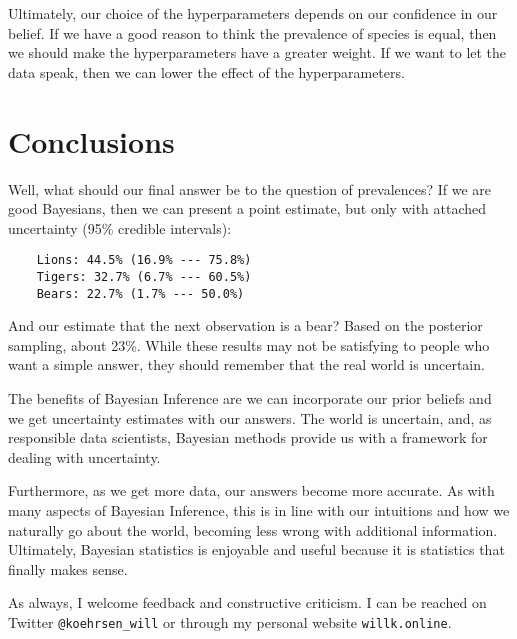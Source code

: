 Ultimately, our choice of the hyperparameters depends on our confidence in our belief. If we have a good reason to think the prevalence of species is equal, then we should make the hyperparameters have a greater weight. If we want to let the data speak, then we can lower the effect of the hyperparameters.

\FloatBarrier
\section{Conclusions}

Well, what should our final answer be to the question of prevalences? If we are good Bayesians, then we can present a point estimate, but only with attached uncertainty (95\% credible intervals):

\begin{lstlisting}
    Lions: 44.5% (16.9% --- 75.8%)
    Tigers: 32.7% (6.7% --- 60.5%)
    Bears: 22.7% (1.7% --- 50.0%)
\end{lstlisting}
And our estimate that the next observation is a bear? Based on the posterior sampling, about 23\%. While these results may not be satisfying to people who want a simple answer, they should remember that the real world is uncertain.

The benefits of Bayesian Inference \cite{RStatModCausalRisks2019} are we can incorporate our prior beliefs and we get uncertainty estimates with our answers. The world is uncertain, and, as responsible data scientists, Bayesian methods provide us with a framework for dealing with uncertainty.

Furthermore, as we get more data, our answers become more accurate. As with many aspects of Bayesian Inference, this is in line with our intuitions and how we naturally go about the world, becoming less wrong with additional information. Ultimately, Bayesian statistics is enjoyable and useful because it is statistics that finally makes sense.

As always, I welcome feedback and constructive criticism. I can be reached on Twitter \lstinline{@koehrsen_will} or through my personal website \lstinline{willk.online}.
